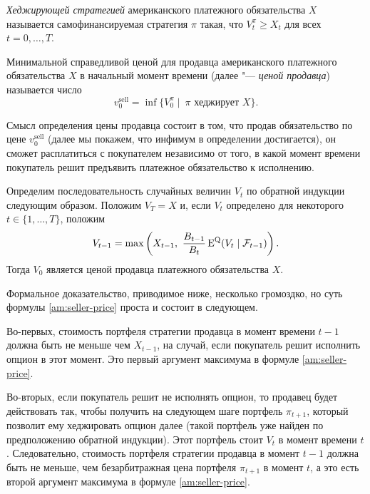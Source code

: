 \begin{definition}
\emph{Хеджирующей стратегией} американского платежного обязательства $X$ называется самофинансируемая стратегия $\pi$ такая, что $V_t^\pi \ge X_t$ для всех $t=0,\dots,T$.

Минимальной справедливой ценой для продавца американского платежного обязательства $X$ в начальный момент времени (далее "--- \emph{ценой продавца}) называется число
\[
v_0^{\text{sell}} = \inf\{V_0^\pi \mid\ \text{$\pi$ хеджирует $X$}\}.
\]
\end{definition}

Смысл определения цены продавца состоит в том, что продав обязательство по цене $v_0^\text{sell}$ (далее мы покажем, что инфимум в определении достигается), он сможет расплатиться с покупателем независимо от того, в какой момент времени покупатель решит предъявить платежное обязательство к исполнению.

\begin{theorem}
\label{5:seller-price}
Определим последовательность случайных величин $V_t$ по обратной индукции следующим образом.
Положим $V_T = X$ и, если $V_t$ определено для некоторого $t\in\{1,\dots,T\}$, положим 
\begin{equation}
\label{am:seller-price}
V_{t-1} = \max\left(X_{t-1},\ \frac{B_{t-1}}{B_t} \operatorname{E}^{\mathrm{Q}}(V_t\mid\mathcal{F}_{t-1})\right).
\end{equation}
Тогда $V_0$ является ценой продавца платежного обязательства $X$.
\end{theorem}

\begin{remark}
Формальное доказательство, приводимое ниже, несколько громоздко, но суть формулы \eqref{am:seller-price} проста и состоит в следующем.

Во-первых, стоимость портфеля стратегии продавца в момент времени $t-1$ должна быть не меньше чем $X_{t-1}$, на случай, если покупатель решит исполнить опцион в этот момент.
Это первый аргумент максимума в формуле \eqref{am:seller-price}.

Во-вторых, если покупатель решит не исполнять опцион, то продавец будет действовать так, чтобы получить на следующем шаге портфель $\pi_{t+1}$, который позволит ему хеджировать опцион далее (такой портфель уже найден по предположению обратной индукции).
Этот портфель стоит $V_t$ в момент времени $t$. 
Следовательно, стоимость портфеля стратегии продавца в момент $t-1$ должна быть не меньше, чем безарбитражная цена портфеля $\pi_{t+1}$ в момент $t$, а это есть второй аргумент максимума в формуле \eqref{am:seller-price}.
\end{remark}

